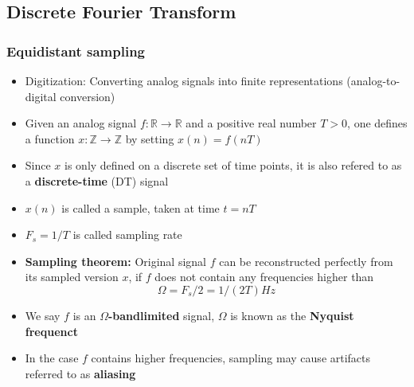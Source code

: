 \subsection{Discrete Fourier Transform}
\subsubsection*{Equidistant sampling}
\begin{itemize}
    \item
        Digitization: Converting analog signals into finite representations (analog-to-di\-gi\-tal conversion) 
    \item
        Given an analog signal $f: \mathbb{R} \rightarrow \mathbb{R}$ and a positive real number $T > 0$, one defines a function $x: \mathbb{Z} \rightarrow \mathbb{Z}$ by setting $x(n) = f(nT)$
    \item
        Since $x$ is only defined on a discrete set of time points, it is also refered to as a \textbf{discrete-time} (DT) signal
    \item
        $x(n)$ is called a sample, taken at time $t = nT$
    \item
        $F_s = 1/T$ is called sampling rate
    \item
        \textbf{Sampling theorem:} Original signal $f$ can be reconstructed perfectly from its sampled version $x$, if $f$ does not contain any frequencies higher than
        $$ \Omega = F_s/2 = 1/(2T) Hz $$
    \item
        We say $f$ is an \textbf{$\Omega$-bandlimited} signal, $\Omega$ is known as the \textbf{Nyquist frequenct}
    \item
        In the case $f$ contains higher frequencies, sampling may cause artifacts referred to as \textbf{aliasing}
\end{itemize}
